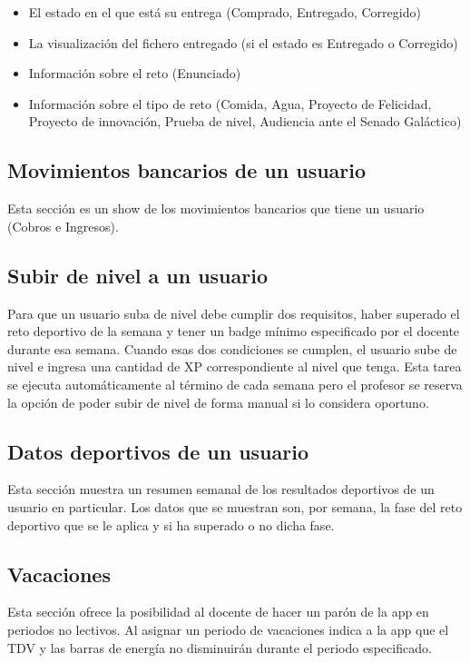 \begin{itemize}
	\item El estado en el que está su entrega (Comprado, Entregado, Corregido)
	\item La visualización del fichero entregado (si el estado es Entregado o Corregido)
	\item Información sobre el reto (Enunciado)
	\item Información sobre el tipo de reto (Comida, Agua, Proyecto de Felicidad, Proyecto de innovación, Prueba de nivel, Audiencia ante el Senado Galáctico)
\end{itemize}

\subsection{Movimientos bancarios de un usuario}
Esta sección es un show de los movimientos bancarios que tiene un usuario (Cobros e Ingresos).

\subsection{Subir de nivel a un usuario}
Para que un usuario suba de nivel debe cumplir dos requisitos, haber superado el reto deportivo de la semana y tener un badge mínimo especificado por el docente durante esa semana. Cuando esas dos condiciones se cumplen, el usuario sube de nivel e ingresa una cantidad de XP correspondiente al nivel que tenga. Esta tarea se ejecuta automáticamente al término de cada semana pero el profesor se reserva la opción de poder subir de nivel de forma manual si lo considera oportuno.

\subsection{Datos deportivos de un usuario}
Esta sección muestra un resumen semanal de los resultados deportivos de un usuario en particular. Los datos que se muestran son, por semana, la fase del reto deportivo que se le aplica y si ha superado o no dicha fase.

\subsection{Vacaciones}
Esta sección ofrece la posibilidad al docente de hacer un parón de la app en periodos no lectivos. Al asignar un periodo de vacaciones indica a la app que el TDV y las barras de energía no disminuirán durante el periodo especificado.

